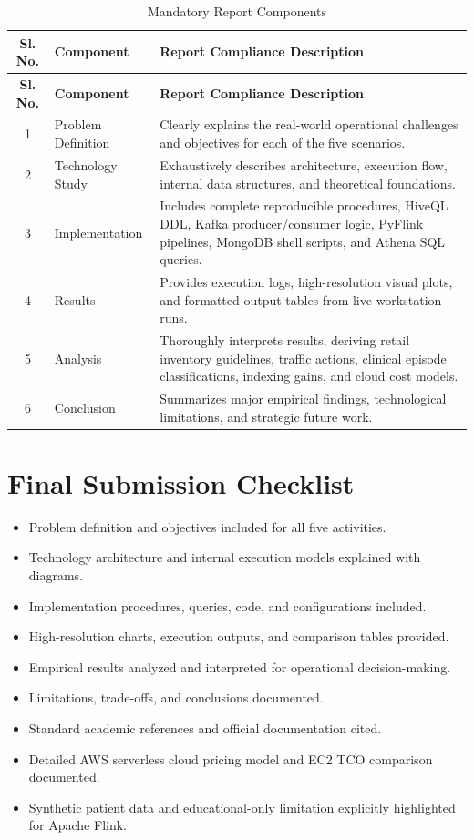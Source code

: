 \documentclass[12pt,a4paper]{report}
\begin{document}
\begin{longtable}{|c|p{3.5cm}|p{8.5cm}|}
\caption{Mandatory Report Components}\\
\hline
\textbf{Sl. No.} & \textbf{Component} & \textbf{Report Compliance Description}\\
\hline
\endfirsthead
\hline
\textbf{Sl. No.} & \textbf{Component} & \textbf{Report Compliance Description}\\
\hline
\endhead
1 & Problem Definition & Clearly explains the real-world operational challenges and objectives for each of the five scenarios.\\
\hline
2 & Technology Study & Exhaustively describes architecture, execution flow, internal data structures, and theoretical foundations.\\
\hline
3 & Implementation & Includes complete reproducible procedures, HiveQL DDL, Kafka producer/consumer logic, PyFlink pipelines, MongoDB shell scripts, and Athena SQL queries.\\
\hline
4 & Results & Provides execution logs, high-resolution visual plots, and formatted output tables from live workstation runs.\\
\hline
5 & Analysis & Thoroughly interprets results, deriving retail inventory guidelines, traffic actions, clinical episode classifications, indexing gains, and cloud cost models.\\
\hline
6 & Conclusion & Summarizes major empirical findings, technological limitations, and strategic future work.\\
\hline
\end{longtable}

\section*{Final Submission Checklist}
\begin{itemize}
    \item[$\checkmark$] Problem definition and objectives included for all five activities.
    \item[$\checkmark$] Technology architecture and internal execution models explained with diagrams.
    \item[$\checkmark$] Implementation procedures, queries, code, and configurations included.
    \item[$\checkmark$] High-resolution charts, execution outputs, and comparison tables provided.
    \item[$\checkmark$] Empirical results analyzed and interpreted for operational decision-making.
    \item[$\checkmark$] Limitations, trade-offs, and conclusions documented.
    \item[$\checkmark$] Standard academic references and official documentation cited.
    \item[$\checkmark$] Detailed AWS serverless cloud pricing model and EC2 TCO comparison documented.
    \item[$\checkmark$] Synthetic patient data and educational-only limitation explicitly highlighted for Apache Flink.
\end{itemize}
\end{document}
